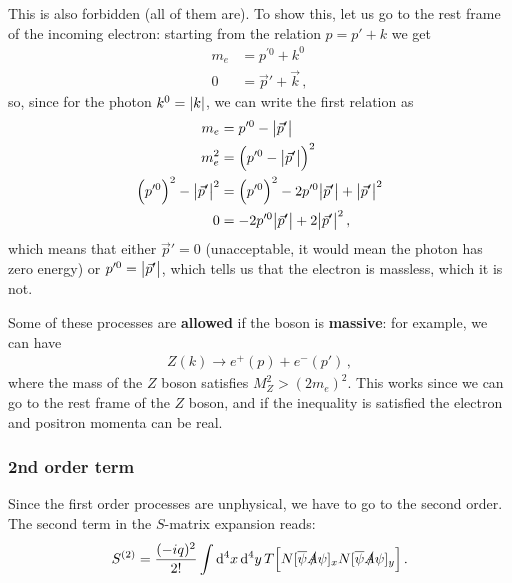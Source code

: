 \documentclass[main.tex]{subfiles}
\begin{document}
This is also forbidden (all of them are). To show this, let us go to the rest frame of the incoming electron: starting from the relation \(p = p' + k\) we get 
%
\begin{align}
m_e &= p^{\prime 0} + k^{0}  \\
0 &= \vec{p}' + \vec{k}
\,,
\end{align}
%
so, since for the photon \(k^{0} = \abs{k}\), we can write the first relation as 
%
\begin{align}
m_e &= p^{\prime 0} - \abs{\vec{p}'}  \\
m_e^2 &= \qty(p^{\prime 0} - \abs{\vec{p}'})^2  \\
\qty(p^{\prime 0})^2 - \abs{\vec{p}'}^2 &= \qty(p^{\prime 0})^2
- 2 p^{\prime 0} \abs{\vec{p}'} + \abs{\vec{p}'}^2  \\
0 &= - 2 p^{\prime 0} \abs{\vec{p}'} + 2 \abs{\vec{p}'}^2
\,,
\end{align}
%
which means that either \(\vec{p}' = 0\) (unacceptable, it would mean the photon has zero energy) or \(p^{\prime 0} = \abs{\vec{p}'}\), which tells us that the electron is massless, which it is not. 

Some of these processes are \textbf{allowed} if the boson is \textbf{massive}: for example, we can have 
%
\begin{align}
Z(k) \to e^{+}(p) + e^{-}(p')
\,,
\end{align}
%
where the mass of the \(Z\) boson satisfies \(M^2_Z > (2 m_e)^2\). 
This works since we can go to the rest frame of the \(Z\) boson, and if the inequality is satisfied the electron and positron momenta can be real. 

\subsubsection{2nd order term}

Since the first order processes are unphysical, we have to go to the second order. The second term in the \(S\)-matrix expansion reads: 
%
\begin{align}
S^{(2)} = \frac{(-iq)^2 }{2!}
\int \dd[4]{x} \dd[4]{y}
T \qty[
    N[\overline{\psi} \slashed{A} \psi ]_{x}
    N[\overline{\psi} \slashed{A} \psi ]_{y}
]
\,.
\end{align}
\end{document}
